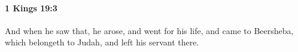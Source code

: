 
		\paragraph{1 Kings 19:3} %
			\label{1KINGS-19-3}

			And when he saw that, he arose, and went for his life, and came to Beersheba, which belongeth to Judah, and left his servant there.


